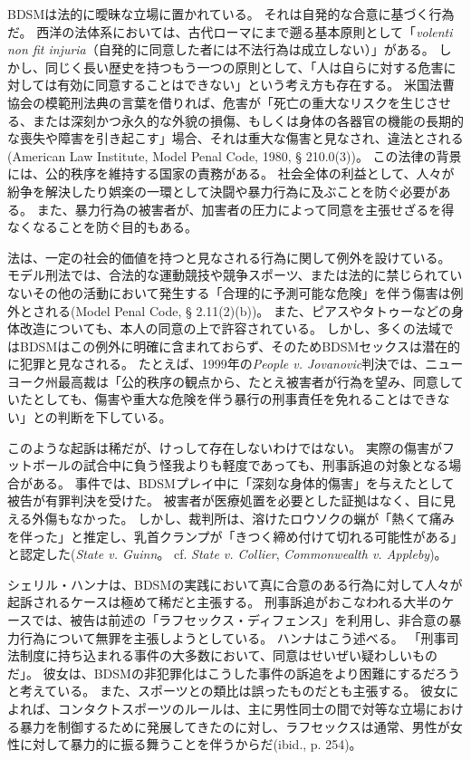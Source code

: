 \documentclass[paper=a4,book,openany]{jlreq} \usepackage{mystyle}
\begin{document}
BDSMは法的に曖昧な立場に置かれている。
それは自発的な合意に基づく行為だ。
西洋の法体系においては、古代ローマにまで遡る基本原則として「\emph{volenti non fit injuria}（自発的に同意した者には不法行為は成立しない）」がある。
しかし、同じく長い歴史を持つもう一つの原則として、「人は自らに対する危害に対しては有効に同意することはできない」という考え方も存在する。
米国法曹協会の模範刑法典の言葉を借りれば、危害が「死亡の重大なリスクを生じさせる、または深刻かつ永久的な外貌の損傷、もしくは身体の各器官の機能の長期的な喪失や障害を引き起こす」場合、それは重大な傷害と見なされ、違法とされる(American Law Institute, Model Penal Code, 1980, § 210.0(3))。
この法律の背景には、公的秩序を維持する国家の責務がある。
社会全体の利益として、人々が紛争を解決したり娯楽の一環として決闘や暴力行為に及ぶことを防ぐ必要がある。
また、暴力行為の被害者が、加害者の圧力によって同意を主張せざるを得なくなることを防ぐ目的もある。

法は、一定の社会的価値を持つと見なされる行為に関して例外を設けている。
モデル刑法では、合法的な運動競技や競争スポーツ、または法的に禁じられていないその他の活動において発生する「合理的に予測可能な危険」を伴う傷害は例外とされる(Model Penal Code, § 2.11(2)(b))。
また、ピアスやタトゥーなどの身体改造についても、本人の同意の上で許容されている。
しかし、多くの法域ではBDSMはこの例外に明確に含まれておらず、そのためBDSMセックスは潜在的に犯罪と見なされる。
たとえば、1999年の\emph{People v. Jovanovic}判決では、ニューヨーク州最高裁は「公的秩序の観点から、たとえ被害者が行為を望み、同意していたとしても、傷害や重大な危険を伴う暴行の刑事責任を免れることはできない」との判断を下している。

このような起訴は稀だが、けっして存在しないわけではない。
実際の傷害がフットボールの試合中に負う怪我よりも軽度であっても、刑事訴追の対象となる場合がある。
事件では、BDSMプレイ中に「深刻な身体的傷害」を与えたとして被告が有罪判決を受けた。
被害者が医療処置を必要とした証拠はなく、目に見える外傷もなかった。
しかし、裁判所は、溶けたロウソクの蝋が「熱くて痛みを伴った」と推定し、乳首クランプが「きつく締め付けて切れる可能性がある」と認定した(\emph{State v. Guinn}。
cf.  \emph{State v. Collier}, \emph{Commonwealth v. Appleby})。

シェリル・ハンナは、BDSMの実践において真に合意のある行為に対して人々が起訴されるケースは極めて稀だと主張する。
刑事訴追がおこなわれる大半のケースでは、被告は前述の「ラフセックス・ディフェンス」を利用し、非合意の暴力行為について無罪を主張しようとしている。
ハンナはこう述べる。
「刑事司法制度に持ち込まれる事件の大多数において、同意はせいぜい疑わしいものだ」\citep[p.248]{hanna01:_sex_is_not_sport}。
彼女は、BDSMの非犯罪化はこうした事件の訴追をより困難にするだろうと考えている。
また、スポーツとの類比は誤ったものだとも主張する。
彼女によれば、コンタクトスポーツのルールは、主に男性同士の間で対等な立場における暴力を制御するために発展してきたのに対し、ラフセックスは通常、男性が女性に対して暴力的に振る舞うことを伴うからだ(ibid., p. 254)。
\end{document}
